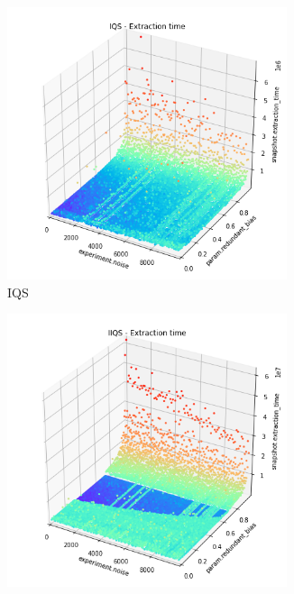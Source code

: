 \begin{figure}
    \centering
    \begin{subfigure}[b]{0.45\textwidth}
        \centering
        \includegraphics[width=0.9\textwidth]{./fragments/04_experimental_execution/images/01_basebenchmark_06_noise_bias.png.1_0.png}
        \caption{IQS}
        \label{FIG:BENCHMARK_06_NOISE_BIAS__0_0}
    \end{subfigure}
    \hfill
    \begin{subfigure}[b]{0.45\textwidth}
        \centering
        \includegraphics[width=0.9\textwidth]{./fragments/04_experimental_execution/images/01_basebenchmark_06_noise_bias.png.0_0.png}

\end{subfigure}
\end{figure}
